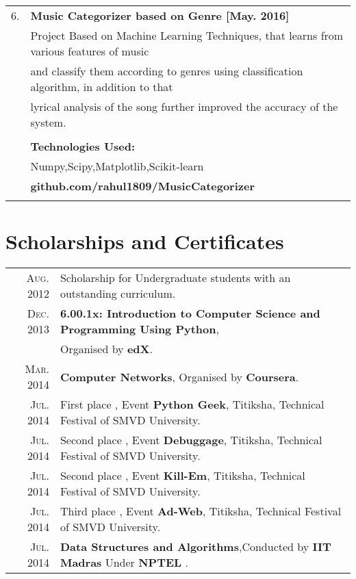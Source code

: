 \documentclass[a4paper,10pt]{article}
\begin{document}
\begin{tabular}{rl}
\textsc{6.} & {\large\textbf{Music Categorizer based on Genre [May. 2016]}}\\ & \textsc Project Based on Machine Learning Techniques, that learns from various features of music \\ & and classify them according to genres using classification algorithm, in addition to that \\ & lyrical analysis of the song further improved the accuracy of the system. \\ & \\ &
 \normalsize\textbf{Technologies Used:}\\ & Numpy,Scipy,Matplotlib,Scikit-learn\\ &
 \normalsize\textbf{github.com/rahul1809/MusicCategorizer}\\ & \\

\end{tabular}


\section{Scholarships and Certificates}
\begin{tabular}{rl}
 \textsc{Aug.} 2012 & Scholarship for Undergraduate students with an outstanding curriculum. \normalsize\\
 \textsc{Dec.} 2013 & \normalsize\textbf{6.00.1x: Introduction to Computer Science and Programming Using Python},\\ & Organised by \normalsize\textbf{edX}.\\
 \textsc{Mar.} 2014 & \normalsize\textbf{Computer Networks}, Organised by \normalsize\textbf{Coursera}.\\
 \textsc{Jul.} 2014 & First place , Event \normalsize\textbf{Python Geek}, Titiksha, Technical Festival of SMVD University.\normalsize\\
 \textsc{Jul.} 2014 & Second place , Event \normalsize\textbf{Debuggage}, Titiksha, Technical Festival of SMVD University.\normalsize\\
 \textsc{Jul.} 2014 & Second place , Event \normalsize\textbf{Kill-Em}, Titiksha, Technical Festival of SMVD University.\normalsize\\
 \textsc{Jul.} 2014 & Third place , Event \normalsize\textbf{Ad-Web}, Titiksha, Technical Festival of SMVD University.\normalsize\\
 \textsc{Jul.} 2014 & \normalsize\textbf{Data Structures and Algorithms},Conducted by  \normalsize\textbf{IIT Madras} Under  \normalsize\textbf{NPTEL} .\normalsize\\
\end{tabular}
\end{document}
